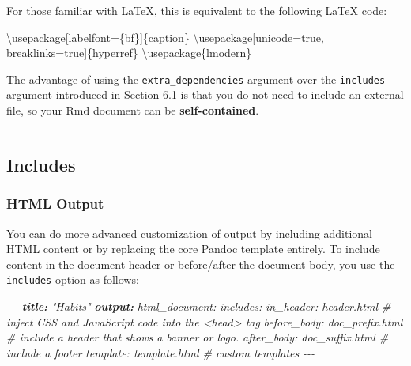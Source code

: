 \documentclass[
  a4paper,
  twoside,
  openright]{book}
\newenvironment{Shaded}{\begin{snugshade}}{\end{snugshade}}
\newcommand{\AnnotationTok}[1]{\textcolor[rgb]{0.56,0.35,0.01}{\textbf{\textit{#1}}}}
\newcommand{\BuiltInTok}[1]{#1}
\newcommand{\CommentTok}[1]{\textcolor[rgb]{0.56,0.35,0.01}{\textit{#1}}}
\newcommand{\ExtensionTok}[1]{#1}
\newcommand{\NormalTok}[1]{#1}
\theoremstyle{definition}
\theoremstyle{definition}
\theoremstyle{definition}
\theoremstyle{definition}
\theoremstyle{remark}
\begin{document}
For those familiar with LaTeX, this is equivalent to the following LaTeX code:

\begin{Shaded}
\begin{Highlighting}[]
\BuiltInTok{\textbackslash{}usepackage}\NormalTok{[labelfont=\{bf\}]\{}\ExtensionTok{caption}\NormalTok{\} }
\BuiltInTok{\textbackslash{}usepackage}\NormalTok{[unicode=true, breaklinks=true]\{}\ExtensionTok{hyperref}\NormalTok{\}}
\BuiltInTok{\textbackslash{}usepackage}\NormalTok{\{}\ExtensionTok{lmodern}\NormalTok{\}}
\end{Highlighting}
\end{Shaded}

The advantage of using the \texttt{extra\_dependencies} argument over the \texttt{includes} argument introduced in Section \href{https://bookdown.org/yihui/rmarkdown-cookbook/latex-preamble.html\#latex-preamble}{6.1} is that you do not need to include an external file, so your Rmd document can be \textbf{self-contained}.

\begin{center}\rule{0.5\linewidth}{0.5pt}\end{center}

\subsection*{Includes}\label{includes}

\subsubsection*{HTML Output}\label{html-output}

You can do more advanced customization of output by including additional HTML content or by replacing the core Pandoc template entirely. To include content in the document header or before/after the document body, you use the \texttt{includes} option as follows:

\begin{Shaded}
\begin{Highlighting}[]
\CommentTok{{-}{-}{-}}
\AnnotationTok{title:}\CommentTok{ "Habits"}
\AnnotationTok{output:}
\CommentTok{  html\_document:}
\CommentTok{    includes:}
\CommentTok{      in\_header: header.html   \# inject CSS and JavaScript code into the \textless{}head\textgreater{} tag}
\CommentTok{      before\_body: doc\_prefix.html  \# include a header that shows a banner or logo.}
\CommentTok{      after\_body: doc\_suffix.html  \# include a footer}
\CommentTok{  template: template.html  \# custom templates}
\CommentTok{{-}{-}{-}}
\end{Highlighting}
\end{Shaded}
\end{document}
